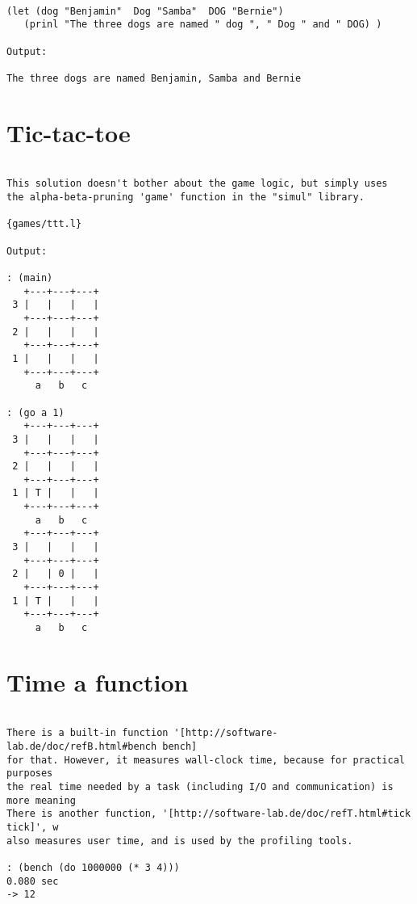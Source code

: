 \begin{verbatim}

(let (dog "Benjamin"  Dog "Samba"  DOG "Bernie")
   (prinl "The three dogs are named " dog ", " Dog " and " DOG) )

Output:

The three dogs are named Benjamin, Samba and Bernie

\end{verbatim}

\section*{Tic-tac-toe}

\begin{verbatim}

This solution doesn't bother about the game logic, but simply uses
the alpha-beta-pruning 'game' function in the "simul" library.

{games/ttt.l}

Output:

: (main)
   +---+---+---+
 3 |   |   |   |
   +---+---+---+
 2 |   |   |   |
   +---+---+---+
 1 |   |   |   |
   +---+---+---+
     a   b   c

: (go a 1)
   +---+---+---+
 3 |   |   |   |
   +---+---+---+
 2 |   |   |   |
   +---+---+---+
 1 | T |   |   |
   +---+---+---+
     a   b   c
   +---+---+---+
 3 |   |   |   |
   +---+---+---+
 2 |   | 0 |   |
   +---+---+---+
 1 | T |   |   |
   +---+---+---+
     a   b   c

\end{verbatim}

\section*{Time a function}

\begin{verbatim}

There is a built-in function '[http://software-lab.de/doc/refB.html#bench bench]
for that. However, it measures wall-clock time, because for practical purposes
the real time needed by a task (including I/O and communication) is more meaning
There is another function, '[http://software-lab.de/doc/refT.html#tick tick]', w
also measures user time, and is used by the profiling tools.

: (bench (do 1000000 (* 3 4)))
0.080 sec
-> 12

\end{verbatim}

